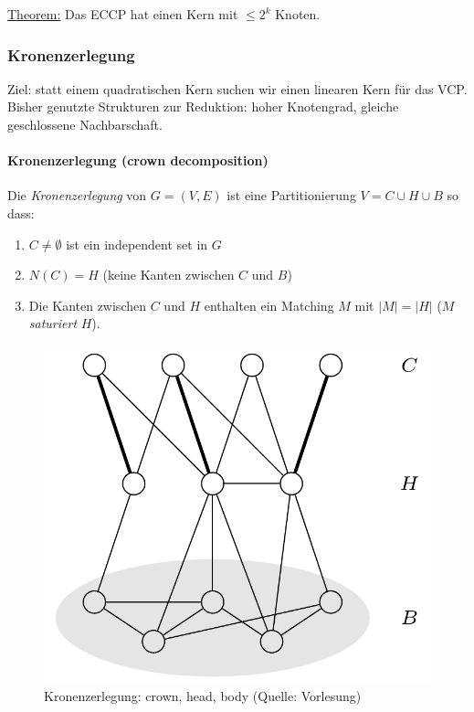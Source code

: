 \underline{Theorem:} Das ECCP hat einen Kern mit $\leq 2^k$ Knoten.


\subsubsection{Kronenzerlegung}

Ziel: statt einem quadratischen Kern suchen wir einen linearen Kern für das VCP. \\
Bisher genutzte Strukturen zur Reduktion: hoher Knotengrad, gleiche geschlossene Nachbarschaft.

\paragraph{Kronenzerlegung (crown decomposition)}
Die \emph{Kronenzerlegung} von $G=(V,E)$ ist eine Partitionierung $V = C \cup H \cup B$ so dass:
\begin{enumerate}[label=(\roman*)]
    \item $C \neq \emptyset$ ist ein independent set in $G$
    \item $N(C) = H$ (keine Kanten zwischen $C$ und $B$)
    \item Die Kanten zwischen $C$ und $H$ enthalten ein Matching $M$ mit $|M| = |H|$ ($M$ \emph{saturiert} $H$).
\end{enumerate}

\begin{figure}[h]
    \centering
	\includegraphics[scale=0.4]{images/crown-decomp.png}
    \caption{Kronenzerlegung: crown, head, body (Quelle: Vorlesung)}
    \label{fig:crown-decomp}
\end{figure}

